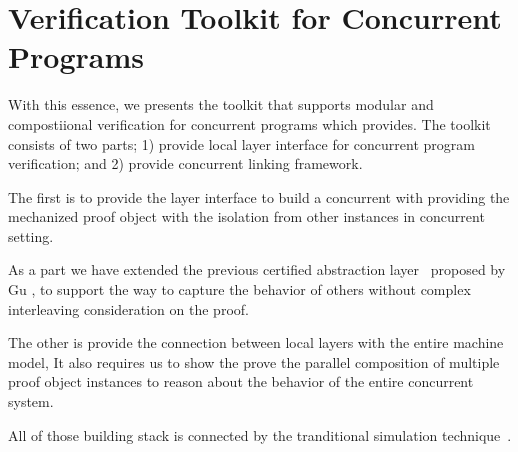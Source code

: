 \section{Verification Toolkit for Concurrent Programs}
\label{chapter:introduction:sec:verification-toolkit-for-concurrent-programs}
%
With this essence, we presents the toolkit that supports modular and compostiional 
verification  for concurrent programs which provides.
The toolkit consists of two parts;
1) provide local layer interface for concurrent program verification;
 and 2) provide concurrent linking framework.
 
 The first is to provide
the layer interface to build a concurrent 
with providing the mechanized proof object 
with the isolation from other instances in concurrent setting. 

As a part we have extended the previous 
certified abstraction layer~\cite{deepspec} proposed by Gu \etal, 
to support 
the way 
to capture the behavior of others 
without complex interleaving consideration on the proof. 


The other is 
provide the connection between 
local layers with the entire machine model, 
It also requires us to show the 
prove the parallel composition of 
multiple proof object instances 
to reason about the behavior of 
the entire concurrent system. 




%
%

All of those building stack is connected by 
the tranditional simulation technique~\cite{compcert, deepspec}.

%
%

